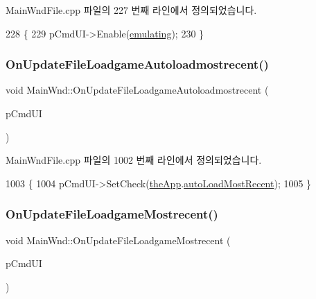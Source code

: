 Main\+Wnd\+File.\+cpp 파일의 227 번째 라인에서 정의되었습니다.


\begin{DoxyCode}
228 \{
229   pCmdUI->Enable(\mbox{\hyperlink{_main_wnd_file_8cpp_af9cc36078b1b311753963297ae7f2a74}{emulating}});
230 \}
\end{DoxyCode}
\mbox{\label{class_main_wnd_abe122b4b5d794d792cdf65a4c066d43d}} 
\subsubsection{\texorpdfstring{On\+Update\+File\+Loadgame\+Autoloadmostrecent()}{OnUpdateFileLoadgameAutoloadmostrecent()}}
{\footnotesize\ttfamily void Main\+Wnd\+::\+On\+Update\+File\+Loadgame\+Autoloadmostrecent (\begin{DoxyParamCaption}\item[{C\+Cmd\+UI $\ast$}]{p\+Cmd\+UI }\end{DoxyParamCaption})\hspace{0.3cm}{\ttfamily [protected]}}



Main\+Wnd\+File.\+cpp 파일의 1002 번째 라인에서 정의되었습니다.


\begin{DoxyCode}
1003 \{
1004   pCmdUI->SetCheck(\mbox{\hyperlink{_v_b_a_8cpp_a8095a9d06b37a7efe3723f3218ad8fb3}{theApp}}.\mbox{\hyperlink{class_v_b_a_aa523f068e8e2939fa2907a95f0881bde}{autoLoadMostRecent}});
1005 \}
\end{DoxyCode}
\mbox{\label{class_main_wnd_ae97e51d61f89103a934b4f55ed09c4d9}} 
\subsubsection{\texorpdfstring{On\+Update\+File\+Loadgame\+Mostrecent()}{OnUpdateFileLoadgameMostrecent()}}
{\footnotesize\ttfamily void Main\+Wnd\+::\+On\+Update\+File\+Loadgame\+Mostrecent (\begin{DoxyParamCaption}\item[{C\+Cmd\+UI $\ast$}]{p\+Cmd\+UI }\end{DoxyParamCaption})\hspace{0.3cm}{\ttfamily [protected]}}



